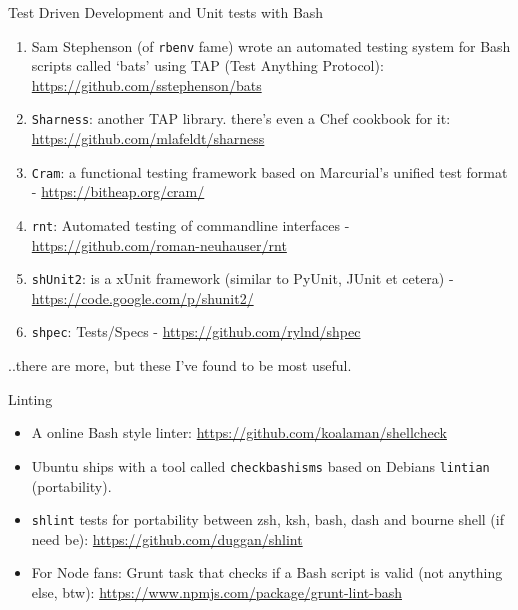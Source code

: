 \begin{frame}{Test Driven Development and Unit tests with Bash}

\begin{enumerate}
\def\labelenumi{\arabic{enumi}.}
\itemsep1pt\parskip0pt
\item
  Sam Stephenson (of \texttt{rbenv} fame) wrote an automated testing
  system for Bash scripts called `bats' using TAP (Test Anything
  Protocol): \url{https://github.com/sstephenson/bats}
\item
  \texttt{Sharness}: another TAP library. there's even a Chef cookbook
  for it: \url{https://github.com/mlafeldt/sharness}
\item
  \texttt{Cram}: a functional testing framework based on Marcurial's
  unified test format - \url{https://bitheap.org/cram/}
\item
  \texttt{rnt}: Automated testing of commandline interfaces -
  \url{https://github.com/roman-neuhauser/rnt}
\item
  \texttt{shUnit2}: is a xUnit framework (similar to PyUnit, JUnit et
  cetera) - \url{https://code.google.com/p/shunit2/}
\item
  \texttt{shpec}: Tests/Specs - \url{https://github.com/rylnd/shpec}
\end{enumerate}

..there are more, but these I've found to be most useful.

\end{frame}

\begin{frame}{Linting}

\begin{itemize}
\itemsep1pt\parskip0pt
\item
  A online Bash style linter:
  \url{https://github.com/koalaman/shellcheck}
\item
  Ubuntu ships with a tool called \texttt{checkbashisms} based on
  Debians \texttt{lintian} (portability).
\item
  \texttt{shlint} tests for portability between zsh, ksh, bash, dash and
  bourne shell (if need be): \url{https://github.com/duggan/shlint}
\item
  For Node fans: Grunt task that checks if a Bash script is valid (not
  anything else, btw):
  \url{https://www.npmjs.com/package/grunt-lint-bash}
\end{itemize}

\end{frame}

